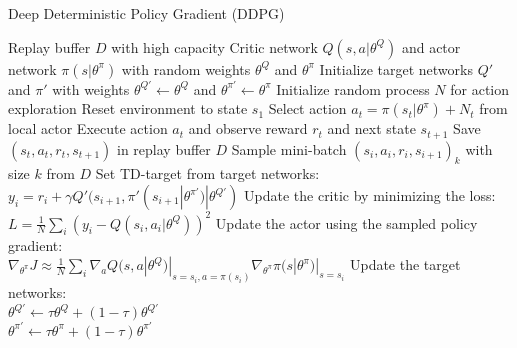 \begin{algorithm} [H]
	\caption{Deep Deterministic Policy Gradient (DDPG)}\label{DDPG-algo}
	\begin{algorithmic}
		\REQUIRE Replay buffer $\mathit{D}$ with high capacity
		\REQUIRE Critic network $Q(s,a|\theta^Q)$ and actor network $\pi(s|\theta^\pi)$ with random weights $\theta^Q$ and $\theta^\pi$
		\REQUIRE Initialize target networks $Q'$ and $\pi'$ with weights $\theta^{Q'}\leftarrow\theta^Q$ and $\theta^{\pi'}\leftarrow\theta^\pi$
		\STATE Initialize random process $\mathit{N}$ for action exploration
		\STATE Reset environment to state $s_1$
		\STATE Select action $a_t = \pi(s_t|\theta^\pi) + \mathit{N}_t$ from local actor
		\STATE Execute action $a_t$ and observe reward $r_t$ and next state $s_{t+1}$
		\STATE Save $(s_t, a_t, r_t,s_{t+1})$ in replay buffer $D$
		\STATE Sample mini-batch $(s_i, a_i, r_i,s_{i+1})_k$ with size $k$ from $D$
		\STATE Set TD-target from target networks:\\
		\qquad $y_i = r_i + \gamma Q'(s_{i+1}, \pi'(s_{i+1}|\theta^{\pi'})|\theta^{Q'})$
		\STATE Update the critic by minimizing the loss:\\
		\qquad $L=\frac{1}{N}\sum_i(y_i - Q(s_i,a_i|\theta^Q))^2$
		\STATE Update the actor using the sampled policy gradient:\\ 			\qquad $\nabla_{\theta^\pi}J \approx \frac{1}{N} \sum_i \nabla_a Q(s,a|\theta^Q)|_{s=s_i, a=\pi(s_i)}\nabla_{\theta^\pi}\pi(s|\theta^\pi)|_{s=s_i}$
		\STATE Update the target networks:\\
		\qquad $\theta^{Q'}\leftarrow \tau \theta^Q + (1-\tau)\theta^{Q'}$\\
		\qquad $\theta^{\pi'}\leftarrow \tau \theta^\pi + (1-\tau)\theta^{\pi'}$
		\ENDFOR
		\ENDFOR
	\end{algorithmic}
\end{algorithm}


